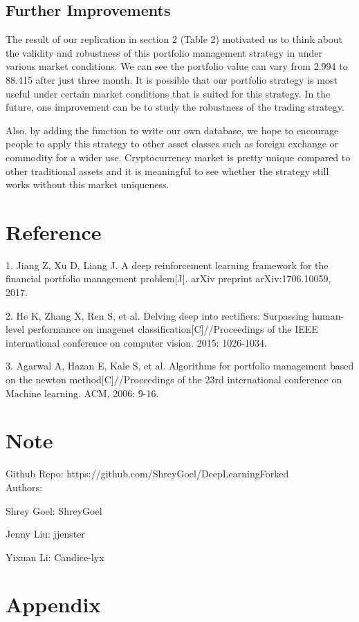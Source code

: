 \documentclass[11pt]{paper}
\begin{document}
	\subsection{Further Improvements}
	The result of our replication in section 2 (Table 2) motivated us to think about the validity and robustness of this portfolio management strategy in under various market conditions. We can see the portfolio value can vary from 2.994 to 88.415 after just three month. It is possible that our portfolio strategy is most useful under certain market conditions that is suited for this strategy. In the future, one improvement can be to study the robustness of the trading strategy.

	Also, by adding the function to write our own database, we hope to encourage people to apply this strategy to other asset classes such as foreign exchange or commodity for a wider use. Cryptocurrency market is pretty unique compared to other traditional assets and it is meaningful to see whether the strategy still works without this market uniqueness.

	\section*{Reference}
	1. Jiang Z, Xu D, Liang J. A deep reinforcement learning framework for the financial portfolio management problem[J]. arXiv preprint arXiv:1706.10059, 2017.

	2. He K, Zhang X, Ren S, et al. Delving deep into rectifiers: Surpassing human-level performance on imagenet classification[C]//Proceedings of the IEEE international conference on computer vision. 2015: 1026-1034.

	3. Agarwal A, Hazan E, Kale S, et al. Algorithms for portfolio management based on the newton method[C]//Proceedings of the 23rd international conference on Machine learning. ACM, 2006: 9-16.
	\section*{Note}
	Github Repo: https://github.com/ShreyGoel/DeepLearningForked\\

	

	Authors:

	Shrey Goel: ShreyGoel

	Jenny Liu: jjenster

	Yixuan Li: Candice-lyx


	\newpage
	\section*{Appendix}
\end{document}
